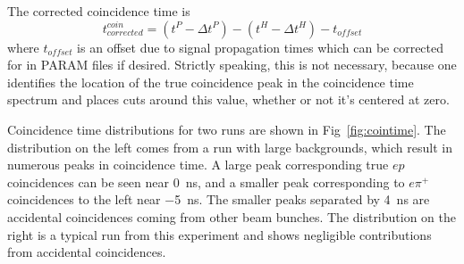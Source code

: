 The corrected coincidence time is
\begin{equation}
    t^{coin}_{corrected} = (t^P - \Delta t^P) - (t^H - \Delta t^H) - t_{offset}
\end{equation}
where $t_{offset}$ is an offset due to signal propagation times which can be
corrected for in PARAM files if desired.
Strictly speaking, this is not necessary, because one identifies the location of
the true coincidence peak in the coincidence time spectrum and places cuts
around this value, whether or not it's centered at zero.

Coincidence time distributions for two runs are shown in
Fig~\ref{fig:cointime}.
The distribution on the left comes from a run with large backgrounds,
which result in numerous peaks in coincidence time.
A large peak corresponding true $ep$ coincidences can be seen near \SI{0}{\nano\second},
and a smaller peak corresponding to $e\pi^+$ coincidences to the left near
\SI{-5}{\nano\second}.
The smaller peaks separated by \SI{4}{\nano\second} are accidental coincidences
coming from other beam bunches.
The distribution on the right is a typical run from this experiment and shows
negligible contributions from accidental coincidences.

